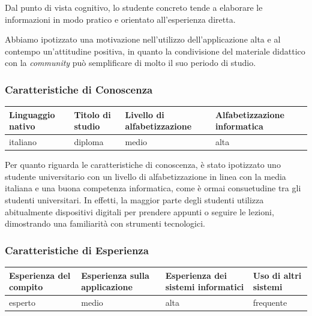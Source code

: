 Dal punto di vista cognitivo, lo studente concreto tende a elaborare le informazioni in modo pratico e orientato all'esperienza diretta.

Abbiamo ipotizzato una motivazione nell'utilizzo dell'applicazione alta e al contempo un'attitudine positiva, in quanto la condivisione del materiale didattico con la \textit{community} può semplificare di molto il suo periodo di studio.

\subsubsection{Caratteristiche di Conoscenza}

\begin{table}[h]
	\centering
	\renewcommand{\arraystretch}{1.5}
	\begin{tabular}{|>{\raggedright\arraybackslash}p{3.5cm}|>{\raggedright\arraybackslash}p{3.5cm}|>{\raggedright\arraybackslash}p{3.5cm}|>{\raggedright\arraybackslash}p{3.5cm}|}
		\hline
		\rowcolor{green!30}
		\textbf{Linguaggio nativo} & \textbf{Titolo di studio} & \textbf{Livello di alfabetizzazione} & \textbf{Alfabetizzazione informatica} \\
		\hline
		italiano                   & diploma                   & medio                                & alta                                  \\
		\hline
	\end{tabular}
\end{table}

Per quanto riguarda le caratteristiche di conoscenza, è stato ipotizzato uno studente universitario con un livello di alfabetizzazione in linea con la media italiana e una buona competenza informatica, come è ormai consuetudine tra gli studenti universitari. In effetti, la maggior parte degli studenti utilizza abitualmente dispositivi digitali per prendere appunti o seguire le lezioni, dimostrando una familiarità con strumenti tecnologici.

\subsubsection{Caratteristiche di Esperienza}

\begin{table}[h]
	\centering
	\renewcommand{\arraystretch}{1.5}
	\begin{tabular}{|>{\raggedright\arraybackslash}p{3.5cm}|>{\raggedright\arraybackslash}p{3.5cm}|>{\raggedright\arraybackslash}p{3.5cm}|>{\raggedright\arraybackslash}p{3.5cm}|}
		\hline
		\rowcolor{green!30}
		\textbf{Esperienza del compito} & \textbf{Esperienza sulla applicazione} & \textbf{Esperienza dei sistemi informatici} & \textbf{Uso di altri sistemi} \\
		\hline
		esperto                         & medio                                  & alta                                        & frequente                     \\
		\hline
	\end{tabular}
\end{table}

